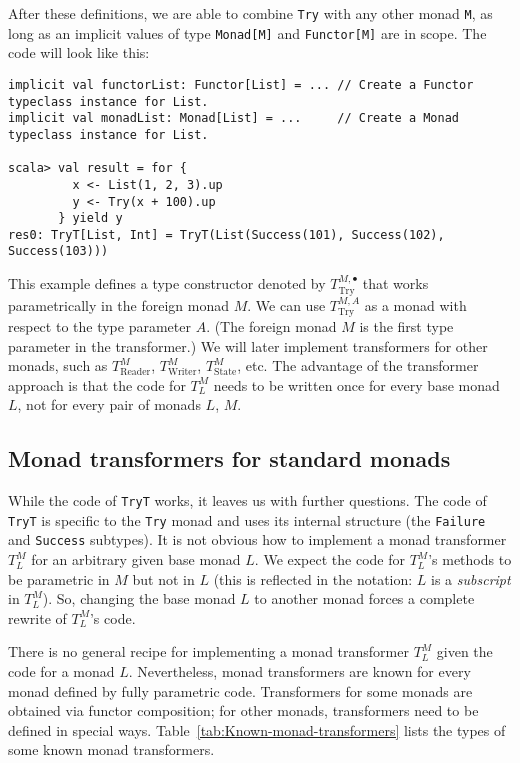  After these definitions, we are able to combine \lstinline!Try!
with any other monad \lstinline!M!, as long as an implicit values
of type \lstinline!Monad[M]! and \lstinline!Functor[M]! are in scope.
The code will look like this:
\begin{lstlisting}
implicit val functorList: Functor[List] = ... // Create a Functor typeclass instance for List.
implicit val monadList: Monad[List] = ...     // Create a Monad typeclass instance for List.

scala> val result = for {
         x <- List(1, 2, 3).up
         y <- Try(x + 100).up
       } yield y
res0: TryT[List, Int] = TryT(List(Success(101), Success(102), Success(103)))
\end{lstlisting}

This example defines a type constructor denoted by $T_{\text{Try}}^{M,\bullet}$
that works parametrically in the foreign monad $M$. We can use $T_{\text{Try}}^{M,A}$
as a monad with respect to the type parameter $A$. (The foreign monad
$M$ is the first type parameter in the transformer.) We will later
implement transformers for other monads, such as $T_{\text{Reader}}^{M}$,
$T_{\text{Writer}}^{M}$, $T_{\text{State}}^{M}$, etc. The advantage
of the transformer approach is that the code for $T_{L}^{M}$ needs
to be written once for every base monad $L$, not for every pair of
monads $L$, $M$.

\subsection{Monad transformers for standard monads\label{subsec:Monad-transformers-for-standard-monads}}

While the code of \lstinline!TryT! works, it leaves us with further
questions. The code of \lstinline!TryT! is specific to the \lstinline!Try!
monad and uses its internal structure (the \lstinline!Failure! and
\lstinline!Success! subtypes). It is not obvious how to implement
a monad transformer $T_{L}^{M}$ for an arbitrary given base monad
$L$. We expect the code for $T_{L}^{M}$\textsf{'}s methods to be parametric
in $M$ but not in $L$ (this is reflected in the notation: $L$ is
a \emph{subscript} in $T_{L}^{M}$). So, changing the base monad $L$
to another monad forces a complete rewrite of $T_{L}^{M}$\textsf{'}s code.

There is no general recipe for implementing a monad transformer $T_{L}^{M}$
given the code for a monad $L$. Nevertheless, monad transformers
are known for every monad defined by fully parametric code. Transformers
for some monads are obtained via functor composition; for other monads,
transformers need to be defined in special ways. Table~\ref{tab:Known-monad-transformers}
lists the types of some known monad transformers. 

